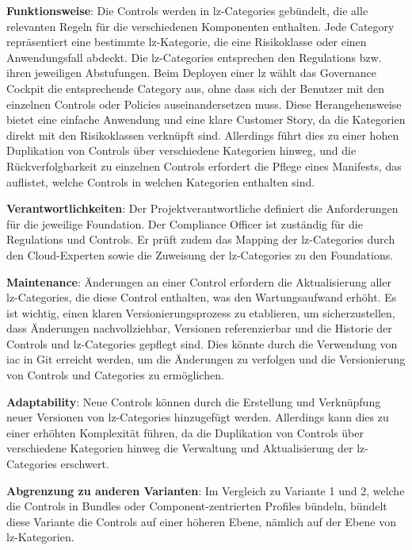 \textbf{Funktionsweise}: Die Controls werden in \ac{lz}-Categories gebündelt, die alle relevanten Regeln für die verschiedenen Komponenten enthalten. Jede Category repräsentiert eine bestimmte \ac{lz}-Kategorie, die eine Risikoklasse oder einen Anwendungsfall abdeckt. Die \ac{lz}-Categories entsprechen den Regulations bzw. ihren jeweiligen Abstufungen. Beim Deployen einer \ac{lz} wählt das Governance Cockpit die entsprechende Category aus, ohne dass sich der Benutzer mit den einzelnen Controls oder Policies auseinandersetzen muss. Diese Herangehensweise bietet eine einfache Anwendung und eine klare Customer Story, da die Kategorien direkt mit den Risikoklassen verknüpft sind. Allerdings führt dies zu einer hohen Duplikation von Controls über verschiedene Kategorien hinweg, und die Rückverfolgbarkeit zu einzelnen Controls erfordert die Pflege eines Manifests, das auflistet, welche Controls in welchen Kategorien enthalten sind.

\textbf{Verantwortlichkeiten}: Der Projektverantwortliche definiert die Anforderungen für die jeweilige Foundation. Der Compliance Officer ist zuständig für die Regulations und Controls. Er prüft zudem das Mapping der \ac{lz}-Categories durch den Cloud-Experten sowie die Zuweisung der \ac{lz}-Categories zu den Foundations.

\textbf{Maintenance}: Änderungen an einer Control erfordern die Aktualisierung aller \ac{lz}-Categories, die diese Control enthalten, was den Wartungsaufwand erhöht. Es ist wichtig, einen klaren Versionierungsprozess zu etablieren, um sicherzustellen, dass Änderungen nachvollziehbar, Versionen referenzierbar und die Historie der Controls und \ac{lz}-Categories gepflegt sind. Dies könnte durch die Verwendung von \ac{iac} in Git erreicht werden, um die Änderungen zu verfolgen und die Versionierung von Controls und Categories zu ermöglichen.

\textbf{Adaptability}: Neue Controls können durch die Erstellung und Verknüpfung neuer Versionen von \ac{lz}-Categories hinzugefügt werden. Allerdings kann dies zu einer erhöhten Komplexität führen, da die Duplikation von Controls über verschiedene Kategorien hinweg die Verwaltung und Aktualisierung der \ac{lz}-Categories erschwert.

\textbf{Abgrenzung zu anderen Varianten}: Im Vergleich zu Variante 1 und 2, welche die Controls in Bundles oder Component-zentrierten Profiles bündeln, bündelt diese Variante die Controls auf einer höheren Ebene, nämlich auf der Ebene von \ac{lz}-Kategorien.

